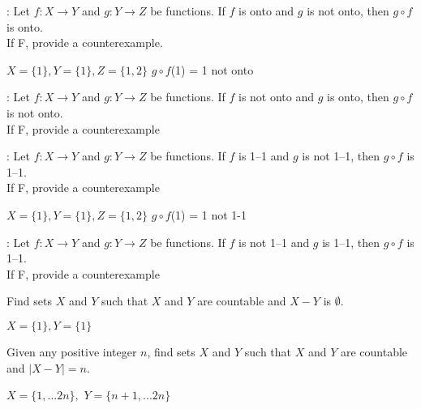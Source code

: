 \nextq
\tf:
Let $f : X \rightarrow Y$ and $g: Y \rightarrow Z$ be functions.
If $f$ is onto and $g$ is not onto, then $g \circ f$ is onto.
\dotfill{}
\\
If F, provide a counterexample.
\begin{answerlong}
    $X = \{1\}, Y=\{1\}, Z=\{1,2\}$
    $g \circ f$(1) = 1 not onto
\end{answerlong}

\nextq
\tf:
Let $f : X \rightarrow Y$ and $g: Y \rightarrow Z$ be functions.
If $f$ is not onto and $g$ is onto, then $g \circ f$ is not onto.
\dotfill{}
\\
If F, provide a counterexample
\begin{answerlong}

\end{answerlong}

\nextq
\tf:
Let $f : X \rightarrow Y$ and $g: Y \rightarrow Z$ be functions.
If $f$ is 1--1 and $g$ is not 1--1, then $g \circ f$ is 1--1.
\dotfill{}
\\
If F, provide a counterexample
\begin{answerlong}
    $X = \{1\}, Y=\{1\}, Z=\{1,2\}$
    $g \circ f$(1) = 1 not 1-1
\end{answerlong}

\nextq
\tf:
Let $f : X \rightarrow Y$ and $g: Y \rightarrow Z$ be functions.
If $f$ is not 1--1 and $g$ is 1--1, then $g \circ f$ is 1--1.
\dotfill{}
\\
If F, provide a counterexample
\begin{answerlong}

\end{answerlong}

\nextq
Find sets $X$ and $Y$ such that 
$X$ and $Y$ are countable and $X - Y$ is $\emptyset$.
\begin{answerlong}
    $X = \{1\}, Y = \{1\}$
\end{answerlong}

\nextq
Given any positive integer $n$,
find sets $X$ and $Y$ such that 
$X$ and $Y$ are countable and $|X - Y| = n$.
\begin{answerlong}
$X = \{1,...2n\},$
$Y = \{n+1,...2n\}$
\end{answerlong}

